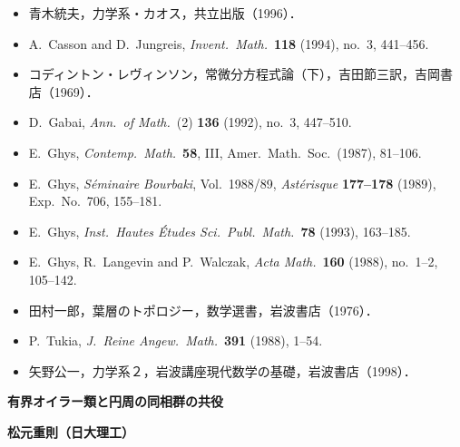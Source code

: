 \documentclass[uplatex,dvipdfmx]{jlreq}
\begin{document}
\begin{itemize}
  \setlength{\itemsep}{3pt}
  \item 青木統夫，力学系・カオス，共立出版（1996）．
  \item A.~Casson and D.~Jungreis,
        \textit{Invent.\ Math.}\ \textbf{118} (1994), no.~3, 441--456.
  \item コディントン・レヴィンソン，常微分方程式論（下），吉田節三訳，吉岡書店（1969）．
  \item D.~Gabai,
        \textit{Ann.\ of Math.}\ (2) \textbf{136} (1992), no.~3, 447--510.
  \item E.~Ghys,
        \textit{Contemp.\ Math.}\ \textbf{58}, III, Amer.\ Math.\ Soc.\ (1987), 81--106.
  \item E.~Ghys,
        \textit{S\'eminaire Bourbaki}, Vol.\ 1988/89,
        \textit{Ast\'erisque} \textbf{177--178} (1989), Exp.\ No.~706, 155--181.
  \item E.~Ghys,
        \textit{Inst.\ Hautes \'Etudes Sci.\ Publ.\ Math.}\ \textbf{78} (1993), 163--185.
  \item E.~Ghys, R.~Langevin and P.~Walczak,
        \textit{Acta Math.}\ \textbf{160} (1988), no.~1--2, 105--142.
  \item 田村一郎，葉層のトポロジー，数学選書，岩波書店（1976）．
  \item P.~Tukia,
        \textit{J.\ Reine Angew.\ Math.}\ \textbf{391} (1988), 1--54.
  \item 矢野公一，力学系２，岩波講座現代数学の基礎，岩波書店（1998）．
\end{itemize}

\newpage

\begin{center}
  {\large\bfseries 有界オイラー類と円周の同相群の共役}
\end{center}
\begin{flushright}
  \textbf{松元重則（日大理工）}
\end{flushright}
\end{document}
